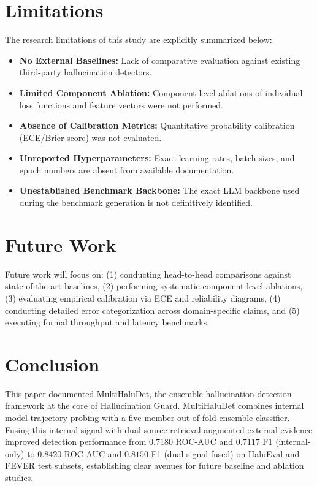 \documentclass[conference]{IEEEtran}
\begin{document}
\section{Limitations}
The research limitations of this study are explicitly summarized below:
\begin{itemize}
    \item \textbf{No External Baselines:} Lack of comparative evaluation against existing third-party hallucination detectors.
    \item \textbf{Limited Component Ablation:} Component-level ablations of individual loss functions and feature vectors were not performed.
    \item \textbf{Absence of Calibration Metrics:} Quantitative probability calibration (ECE/Brier score) was not evaluated.
    \item \textbf{Unreported Hyperparameters:} Exact learning rates, batch sizes, and epoch numbers are absent from available documentation.
    \item \textbf{Unestablished Benchmark Backbone:} The exact LLM backbone used during the benchmark generation is not definitively identified.
\end{itemize}

\section{Future Work}
Future work will focus on: (1) conducting head-to-head comparisons against state-of-the-art baselines, (2) performing systematic component-level ablations, (3) evaluating empirical calibration via ECE and reliability diagrams, (4) conducting detailed error categorization across domain-specific claims, and (5) executing formal throughput and latency benchmarks.

\section{Conclusion}
This paper documented MultiHaluDet, the ensemble hallucination-detection framework at the core of Hallucination Guard. MultiHaluDet combines internal model-trajectory probing with a five-member out-of-fold ensemble classifier. Fusing this internal signal with dual-source retrieval-augmented external evidence improved detection performance from $0.7180$ ROC-AUC and $0.7117$ F1 (internal-only) to $0.8420$ ROC-AUC and $0.8150$ F1 (dual-signal fused) on HaluEval and FEVER test subsets, establishing clear avenues for future baseline and ablation studies.
\end{document}

